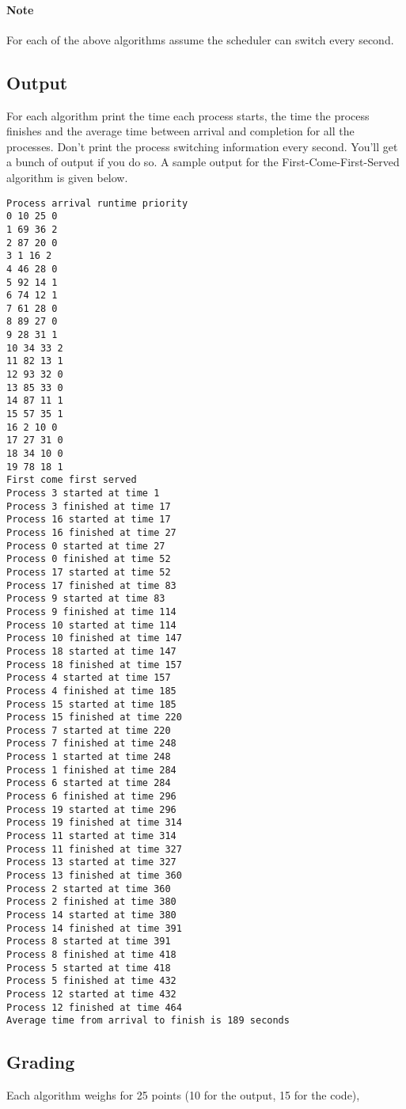 \documentclass[letterpaper,10pt]{article}
\begin{document}
\paragraph{Note} For each of the above algorithms assume the scheduler can switch every
second.

\subsection{Output}
For each algorithm print the time each process starts, the time the process finishes and
the average time between arrival and completion for all the processes. Don't print the
process switching information every second. You'll get a bunch of output if you do so. A
sample output for the First-Come-First-Served algorithm is given below.
\begin{verbatim}
Process arrival runtime priority
0 10 25 0
1 69 36 2
2 87 20 0
3 1 16 2
4 46 28 0
5 92 14 1
6 74 12 1
7 61 28 0
8 89 27 0
9 28 31 1
10 34 33 2
11 82 13 1
12 93 32 0
13 85 33 0
14 87 11 1
15 57 35 1
16 2 10 0
17 27 31 0
18 34 10 0
19 78 18 1
First come first served
Process 3 started at time 1
Process 3 finished at time 17
Process 16 started at time 17
Process 16 finished at time 27
Process 0 started at time 27
Process 0 finished at time 52
Process 17 started at time 52
Process 17 finished at time 83
Process 9 started at time 83
Process 9 finished at time 114
Process 10 started at time 114
Process 10 finished at time 147
Process 18 started at time 147
Process 18 finished at time 157
Process 4 started at time 157
Process 4 finished at time 185
Process 15 started at time 185
Process 15 finished at time 220
Process 7 started at time 220
Process 7 finished at time 248
Process 1 started at time 248
Process 1 finished at time 284
Process 6 started at time 284
Process 6 finished at time 296
Process 19 started at time 296
Process 19 finished at time 314
Process 11 started at time 314
Process 11 finished at time 327
Process 13 started at time 327
Process 13 finished at time 360
Process 2 started at time 360
Process 2 finished at time 380
Process 14 started at time 380
Process 14 finished at time 391
Process 8 started at time 391
Process 8 finished at time 418
Process 5 started at time 418
Process 5 finished at time 432
Process 12 started at time 432
Process 12 finished at time 464
Average time from arrival to finish is 189 seconds
\end{verbatim}
\subsection{Grading}
Each algorithm weighs for 25 points (10 for the output, 15 for the code),
\end{document}
